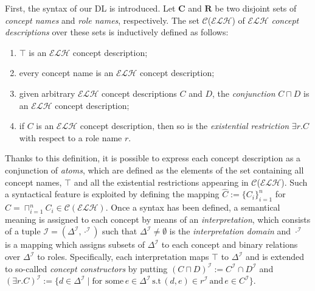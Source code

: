 \documentclass[]{llncs}
\newcommand{\elh}{\(\mathcal{ELH}{}\)}
\newcommand{\DeltaI}{\Delta^\mathcal{I}}
\newcommand{\dotI}{\cdot^{\mathcal{I}}}
\begin{document}
  First, the syntax of our DL is introduced.
  Let \(\mathbf{C}\) and \(\mathbf{R}\) be two disjoint sets of \emph{concept names} and \emph{role names}, respectively. The set \(\mathcal{C}\)(\elh) of \elh{} \emph{concept descriptions} over these sets is inductively defined as follows:
  \begin{enumerate}
    \item \(\top{}\) is an \elh{} concept description;
    \item every concept name is an \elh{} concept description;
    \item given arbitrary \elh{} concept descriptions \(C\) and \(D\), the \emph{conjunction} \(C \sqcap D\) is an \elh{} concept description;
    \item if \(C\) is an \elh{} concept description, then so is the \emph{existential restriction} \(\exists{}r.C\) with respect to a role name \(r\).
  \end{enumerate}
  Thanks to this definition, it is possible to express each concept description as a conjunction of \emph{atoms}, which are defined as the elements of the set containing all concept names, \(\top{}\) and all the existential restrictions appearing in \(\mathcal{C}\)(\elh).
  Such a syntactical feature is exploited by defining the mapping
  \(\widehat{C} := \lbrace C_i\rbrace_{i=1}^n\) for
  \(C = \sqcap_{i=1}^n C_i \in \mathcal{C}(\mathcal{ELH})\).
  Once a syntax has been defined, a semantical meaning is assigned to each concept by means of an \emph{interpretation}, which consists of a tuple \(\mathcal{I} = (\DeltaI,\dotI)\) such that \(\DeltaI \ne \emptyset\) is the \emph{interpretation domain} and \(\dotI\) is a mapping which assigns subsets of \(\DeltaI{}\) to each concept and binary relations over \(\DeltaI\) to roles.
  Specifically, each interpretation maps \(\top{}\) to \(\DeltaI\) and is extended to so-called \emph{concept constructors} by putting
  \({(C \sqcap D)}^\mathcal{I} := C^\mathcal{I} \cap D^\mathcal{I}\) and
  \({(\exists{}r.C)}^\mathcal{I} :=
    \lbrace d \in \DeltaI \mid \text{for some} \, e \in \DeltaI
          \,\text{s.t}\, (d,e) \in r^\mathcal{I} \,\text{and}\, e \in
          C^\mathcal{I} \rbrace\).
\end{document}
